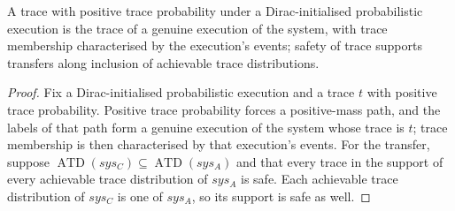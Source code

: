 \begin{theorem}
  \label{thm:trace-support}
  \leanok
  A trace with positive trace probability under a Dirac-initialised probabilistic execution is the trace of a genuine execution of the system, with trace membership characterised by the execution's events; safety of trace supports transfers along inclusion of achievable trace distributions.
\end{theorem}

\begin{proof}\leanok
  Fix a Dirac-initialised probabilistic execution and a trace $t$ with positive trace probability.
  Positive trace probability forces a positive-mass path, and the labels of that path form a genuine execution of the system whose trace is $t$; trace membership is then characterised by that execution's events.
  For the transfer, suppose $\operatorname{ATD}(sys_C) \subseteq \operatorname{ATD}(sys_A)$ and that every trace in the support of every achievable trace distribution of $sys_A$ is safe.
  Each achievable trace distribution of $sys_C$ is one of $sys_A$, so its support is safe as well.
\end{proof}
